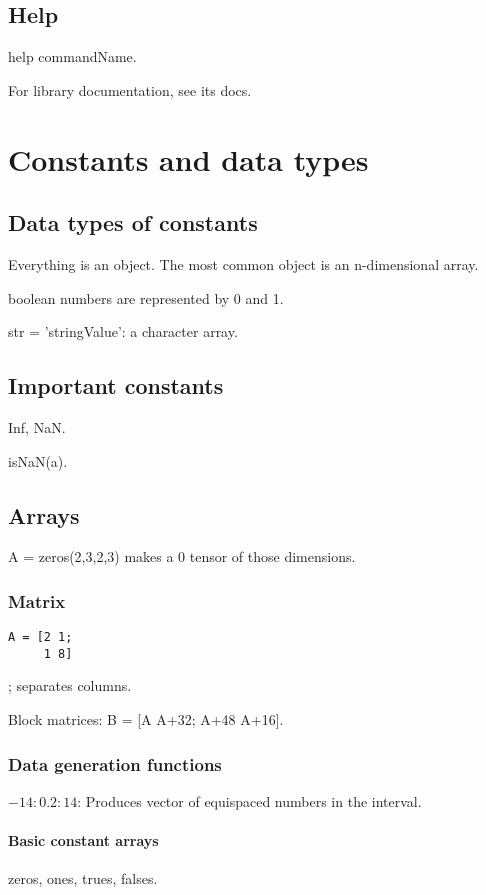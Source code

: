 \documentclass[oneside, article]{memoir}
\begin{document}
\subsection{Help}
help commandName.

For library documentation, see its docs.

\section{Constants and data types}
\subsection{Data types of constants}
Everything is an object. The most common object is an n-dimensional array.

boolean numbers are represented by 0 and 1.

str = 'stringValue': a character array.

\subsection{Important constants}
Inf, NaN.

isNaN(a).

\subsection{Arrays}
A = zeros(2,3,2,3) makes a 0 tensor of those dimensions.

\subsubsection{Matrix}
\begin{verbatim}
A = [2 1;
     1 8]
\end{verbatim}
; separates columns.

Block matrices: B = [A  A+32; A+48  A+16].

\subsubsection{Data generation functions}
$-14:0.2:14$: Produces vector of equispaced numbers in the interval.

\paragraph*{Basic constant arrays}
zeros, ones, trues, falses.
\end{document}
